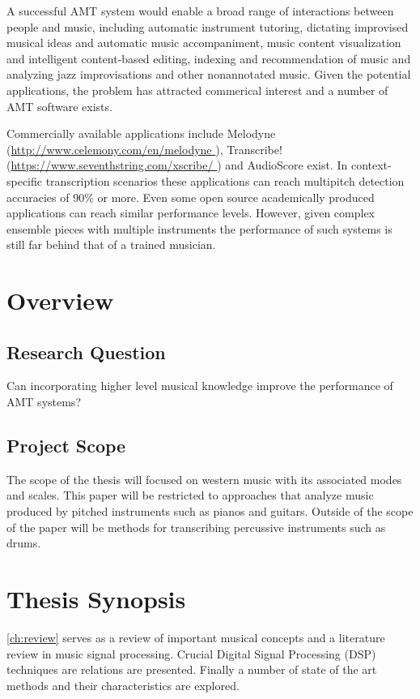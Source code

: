 A successful \ac{AMT} system would enable a broad range of interactions between
people and music, including automatic instrument tutoring, dictating improvised
musical ideas and automatic music accompaniment, music content visualization and
intelligent content-based editing, indexing and recommendation of music and
analyzing jazz improvisations and other nonannotated music. Given the potential
applications, the problem has attracted commerical interest and a number of AMT
software exists. \cite{amtfc2013:Benetos}

Commercially available applications include Melodyne (\url{http://www.celemony.com/en/melodyne }), Transcribe!(\url{https://www.seventhstring.com/xscribe/ })  and AudioScore exist.
In context-specific transcription scenarios these applications can reach multipitch detection accuracies of 90\% or more. Even some open source
academically produced applications can reach similar performance levels. \cite{context-dependent2016:Cogliati}
However, given complex ensemble pieces with multiple instruments the performance of such systems
is still far behind that of a trained musician.

\section{Overview}

\subsection{Research Question}

Can incorporating higher level musical knowledge
improve the performance of \ac{AMT} systems?

\subsection{Project Scope}

The scope of the thesis will focused on western music with its associated modes
and scales. This paper will be restricted to approaches that analyze music
produced by pitched instruments such as pianos and guitars. Outside of the scope
of the paper will be methods for transcribing percussive instruments such as
drums.

\section{Thesis Synopsis}

\autoref{ch:review} serves as a review of important musical concepts and a
literature review in music signal processing. Crucial Digital Signal Processing
(DSP) techniques are relations are presented. Finally a number of state of the
art methods and their characteristics are explored.

